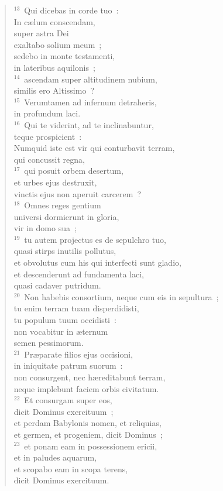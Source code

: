 \begin{verse}
${}^{13}$~Qui dicebas in corde tuo~:\\ In c\ae lum conscendam,\\ super astra Dei\\ exaltabo solium meum~;\\ sedebo in monte testamenti,\\ in lateribus aquilonis~;\\
${}^{14}$~ascendam super altitudinem nubium,\\ similis ero Altissimo~?\\
${}^{15}$~Verumtamen ad infernum detraheris,\\ in profundum laci.\\
${}^{16}$~Qui te viderint, ad te inclinabuntur,\\ teque prospicient~:\\ Numquid iste est vir qui conturbavit terram,\\ qui concussit regna,\\
${}^{17}$~qui posuit orbem desertum,\\ et urbes ejus destruxit,\\ vinctis ejus non aperuit carcerem~?\\
${}^{18}$~Omnes reges gentium\\ universi dormierunt in gloria,\\ vir in domo sua~;\\
${}^{19}$~tu autem projectus es de sepulchro tuo,\\ quasi stirps inutilis pollutus,\\ et obvolutus cum his qui interfecti sunt gladio,\\ et descenderunt ad fundamenta laci,\\ quasi cadaver putridum.\\
${}^{20}$~Non habebis consortium, neque cum eis in sepultura~;\\ tu enim terram tuam disperdidisti,\\ tu populum tuum occidisti~:\\ non vocabitur in \ae ternum\\ semen pessimorum.\\
${}^{21}$~Pr\ae parate filios ejus occisioni,\\ in iniquitate patrum suorum~:\\ non consurgent, nec h\ae reditabunt terram,\\ neque implebunt faciem orbis civitatum.\\
${}^{22}$~Et consurgam super eos,\\ dicit Dominus exercituum~;\\ et perdam Babylonis nomen, et reliquias,\\ et germen, et progeniem, dicit Dominus~;\\
${}^{23}$~et ponam eam in possessionem ericii,\\ et in paludes aquarum,\\ et scopabo eam in scopa terens,\\ dicit Dominus exercituum.\end{verse}


